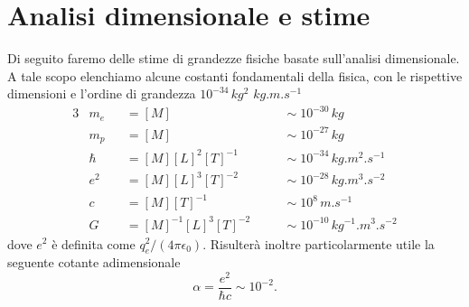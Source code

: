 \section{Analisi dimensionale e stime}
Di seguito faremo delle stime di grandezze fisiche basate sull'analisi dimensionale. A tale scopo elenchiamo alcune costanti fondamentali della fisica, con le rispettive dimensioni e l'ordine di grandezza $ 10^{-34} \, \si{kg^2} $ $ \si{kg.m.s^{-1}} $
\begin{alignat*}{3}
& m_e && = [M] && \quad \sim 10^{-30} \, \si{kg} \\
& m_p && = [M] && \quad \sim 10^{-27} \, \si{kg} \\
& \hbar && = [M] [L]^2 [T]^{-1} && \quad \sim 10^{-34} \, \si{kg.m^{2}.s^{-1}} \\
& e^2 && = [M] [L]^3 [T]^{-2} && \quad \sim 10^{-28} \, \si{kg.m^3.s^{-2}} \\
& c && = [M] [T]^{-1} && \quad \sim 10^8 \, \si{m.s^{-1}} \\
& G && = [M]^{-1} [L]^3 [T]^{-2} && \quad \sim 10^{-10} \, \si{kg^{-1}.m^3.s^{-2}}
\end{alignat*}
dove $ e^2 $ è definita come $ q_e^2 / (4 \pi \epsilon_0) $. Risulterà inoltre particolarmente utile la seguente cotante adimensionale \[ \alpha = \frac{e^2}{\hbar c} \sim 10^{-2}.\]

